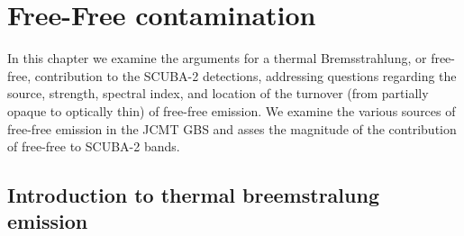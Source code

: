 \chapter{Free-Free contamination}
\label{ch:chapter4}

In this chapter we examine the arguments for a thermal Bremsstrahlung, or free-free, 
contribution to the SCUBA-2 detections, addressing questions regarding the source, 
strength, spectral index, and location of the turnover (from partially opaque to optically 
thin) of free-free emission. We examine the various sources of free-free emission in 
the JCMT GBS and asses the magnitude of the contribution of free-free to SCUBA-2 
bands.

\section{Introduction to thermal breemstralung emission}

